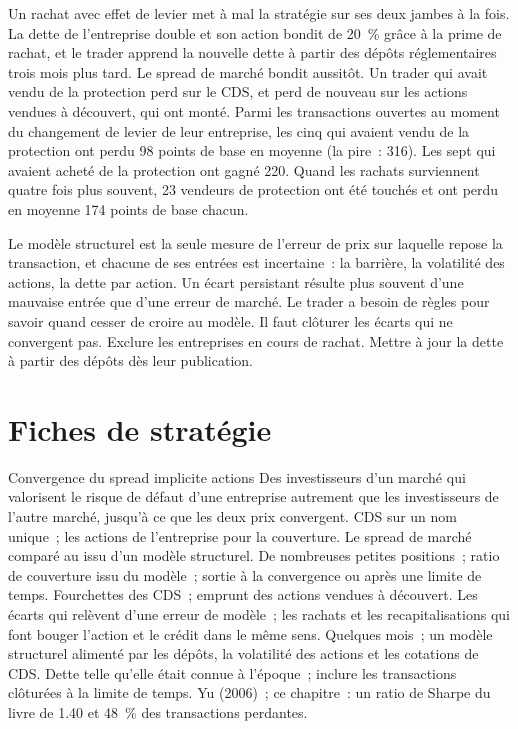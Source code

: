 Un rachat avec effet de levier met à mal la stratégie sur ses deux jambes à la fois. La dette de l'entreprise double et son action bondit de 20~\% grâce à la prime de rachat, et le trader
apprend la nouvelle dette à partir des dépôts réglementaires trois mois plus tard. Le spread de marché bondit aussitôt. Un trader qui avait vendu de la protection perd sur le CDS, et perd
de nouveau sur les actions vendues à découvert, qui ont monté. Parmi les transactions ouvertes au moment du changement de levier de leur entreprise, les cinq qui avaient vendu de la protection ont perdu 98 points de base
en moyenne (la pire~: 316). Les sept qui avaient acheté de la protection ont gagné 220. Quand les rachats surviennent quatre fois plus souvent, 23 vendeurs de protection ont été touchés
et ont perdu en moyenne 174 points de base chacun.

Le modèle structurel est la seule mesure de l'erreur de prix sur laquelle repose la transaction, et chacune de ses entrées est incertaine~: la barrière, la volatilité des actions, la dette par action.
Un écart persistant résulte plus souvent d'une mauvaise entrée que d'une erreur de marché. Le trader a besoin de règles pour savoir quand cesser de croire au modèle. Il faut clôturer les écarts qui ne
convergent pas. Exclure les entreprises en cours de rachat. Mettre à jour la dette à partir des dépôts dès leur publication.

\section{Fiches de stratégie}

\begin{strategyfile}{Convergence du spread implicite actions}\label{strat:s2:capital-structure-arbitrage:convergence}
 Des investisseurs d'un marché qui valorisent le risque de défaut d'une entreprise autrement que les investisseurs de l'autre marché, jusqu'à ce que les deux
prix convergent.
 CDS sur un nom unique~; les actions de l'entreprise pour la couverture.
 Le spread de marché comparé au  issu d'un modèle structurel.
 De nombreuses petites positions~; ratio de couverture issu du modèle~; sortie à la convergence ou après une limite de temps.
 Fourchettes des CDS~; emprunt des actions vendues à découvert.
 Les écarts qui relèvent d'une erreur de modèle~; les rachats et les recapitalisations qui font bouger l'action et le crédit dans le même sens.
 Quelques mois~; un modèle structurel alimenté par les dépôts, la volatilité des actions et les cotations de CDS.
 Dette telle qu'elle était connue à l'époque~; inclure les transactions clôturées à la limite de temps.
 Yu (2006)~; ce chapitre~: un ratio de Sharpe du livre de 1.40 et 48~\% des transactions perdantes.
\end{strategyfile}

